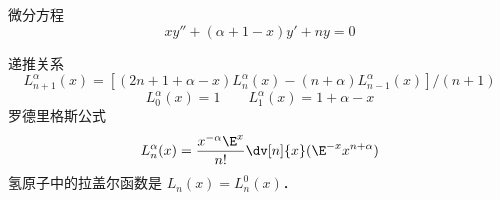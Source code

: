 
\begin{issues}
\issueDraft
\end{issues}

微分方程
\begin{equation}
xy'' + (\alpha + 1 - x) y' + ny = 0
\end{equation}


递推关系
\begin{equation}
L_{n+1}^\alpha (x) = [(2n + 1 + \alpha  - x)L_n^\alpha (x) - (n + \alpha )L_{n - 1}^\alpha (x)]/(n + 1)
\end{equation}
\begin{equation}
L_0^\alpha (x) = 1
\qquad
L_1^\alpha (x) = 1 + \alpha  - x
\end{equation}  
罗德里格斯公式
\begin{equation}
L_n^\alpha (x) = \frac{x^{-\alpha} \E^x}{n!} \dv[n]{x} (\E^{-x} x^{n+\alpha})
\end{equation}
氢原子中的拉盖尔函数是 $L_n(x) = L_n^0(x)$．


